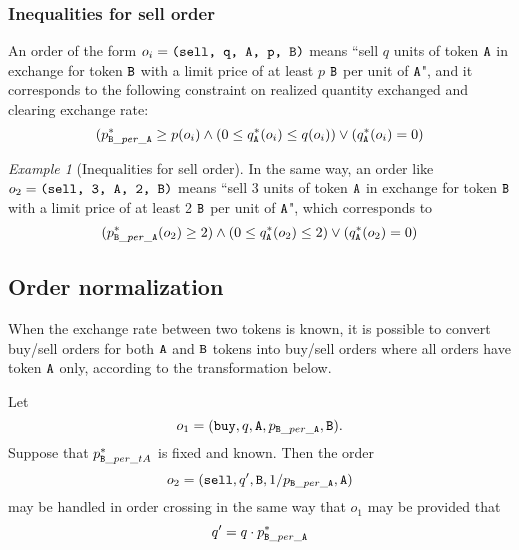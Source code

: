 \documentclass[11pt, reqno]{amsart}
\theoremstyle{definition}
\theoremstyle{remark}
\newtheorem{exmp}{Example}[subsection]
\newcommand{\tA}{\textnormal{\texttt{A}}}
\newcommand{\tB}{\textnormal{\texttt{B}}}
\newcommand{\buy}{\textnormal{\texttt{buy}}}
\newcommand{\sell}{\textnormal{\texttt{sell}}}
\begin{document}
\subsubsection{Inequalities for sell order}
An order of the form $o_i = \texttt{(\sell, q, \tA, p, \tB)}$ means
``sell $q$ units of token $\tA$ in exchange for token $\tB$ with a limit price
of at least $p$ $\tB$ per unit of $\tA$",
and it corresponds to the following constraint on realized quantity exchanged
and clearing exchange rate:
\begin{equation*}
	(p_{\tB\_per\_\tA}^* \geq p(o_i) \land
	(0 \le q_\tA^*(o_i) \leq q(o_i)) \lor
    (q_\tA^*(o_i) = 0)
\end{equation*}

\begin{exmp}[Inequalities for sell order]
In the same way, an order like $o_2 = \texttt{(sell, 3, \tA, 2, \tB)}$ means
``sell 3 units of token $\tA$ in exchange for token $\tB$ with a limit price of
at least 2 $\tB$ per unit of $\tA$", which corresponds to
\begin{equation*}
	(p_{\tB\_per\_\tA}^*(o_2) \geq 2) \land
	(0 \le q_\tA^*(o_2) \leq 2) \lor
	(q_\tA^*(o_2) = 0)
\end{equation*}
\end{exmp}

\subsection{Order normalization}
When the exchange rate between two tokens is known, it is possible to convert
buy/sell orders for both $\tA$ and $\tB$ tokens into buy/sell orders where all
orders have token $\tA$ only, according to the transformation below.

Let
\[
	o_1 = (\buy, q, \tA, p_{\tB\_per\_\tA}, \tB).
\]
Suppose that $p^*_{\tB\_per\_tA}$ is fixed and known. Then the order
\[
	o_2 = (\sell, q^\prime, \tB, 1 / p_{\tB\_per\_\tA}, \tA)
\]
may be handled in order crossing in the same way that $o_1$ may be
provided that
\[
	q^\prime = q \cdot p^*_{\tB\_per\_\tA}
\]

%
%
%
\end{document}

